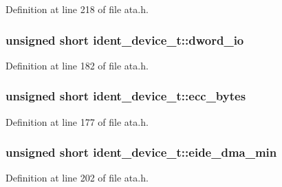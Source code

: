Definition at line 218 of file ata.\+h.

\subsubsection[{\texorpdfstring{dword\+\_\+io}{dword_io}}]{\setlength{\rightskip}{0pt plus 5cm}unsigned short ident\+\_\+device\+\_\+t\+::dword\+\_\+io}\hypertarget{structident__device__t_a8105ba5d1d0794158b141ddba3b396c4}{}\label{structident__device__t_a8105ba5d1d0794158b141ddba3b396c4}


Definition at line 182 of file ata.\+h.

\subsubsection[{\texorpdfstring{ecc\+\_\+bytes}{ecc_bytes}}]{\setlength{\rightskip}{0pt plus 5cm}unsigned short ident\+\_\+device\+\_\+t\+::ecc\+\_\+bytes}\hypertarget{structident__device__t_af5aba8d177b13759ad10593aefef75de}{}\label{structident__device__t_af5aba8d177b13759ad10593aefef75de}


Definition at line 177 of file ata.\+h.

\subsubsection[{\texorpdfstring{eide\+\_\+dma\+\_\+min}{eide_dma_min}}]{\setlength{\rightskip}{0pt plus 5cm}unsigned short ident\+\_\+device\+\_\+t\+::eide\+\_\+dma\+\_\+min}\hypertarget{structident__device__t_ac9b15de363f7fe0dcc8ca3c1a5bc9989}{}\label{structident__device__t_ac9b15de363f7fe0dcc8ca3c1a5bc9989}


Definition at line 202 of file ata.\+h.

